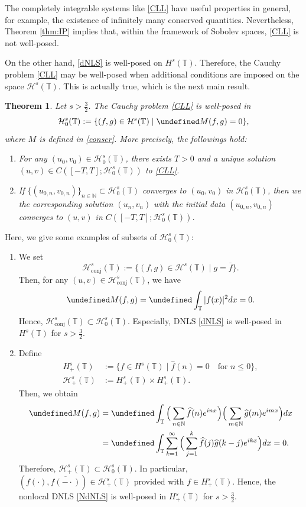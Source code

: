 \documentclass[%
11pt,  reqno]{amsart}
\newtheorem{theorem}{Theorem} [section]
\newcommand{\T}{\mathbb{T}}
\newcommand{\N}{\mathbb{N}}
\renewcommand{\H}{\mathcal H}
\newcommand{\ft}{\widehat}
\newcommand{\cj}{\overline}
\numberwithin{equation}{section}
\numberwithin{theorem}{section}
\let\Im=\undefined\DeclareMathOperator*{\Im}{Im}
\begin{document}
The completely integrable systems like \eqref{CLL} have useful properties in general,
for example, the existence of infinitely many conserved quantities. 
Nevertheless, 
Theorem \ref{thm:IP} implies that, 
within the framework of Sobolev spaces, 
\eqref{CLL} is not well-posed.

On the other hand, 
\eqref{dNLS} is well-posed on $H^s(\T)$. 
Therefore, 
the Cauchy problem \eqref{CLL} may be well-posed 
when additional conditions are imposed on the space $\H^s(\T)$.
This is actually true, which is the next main result.

\begin{theorem}
\label{thm:WP}
Let $s > \frac 32$.
The Cauchy problem \eqref{CLL} is well-posed in 
\begin{equation}
\H_0^s (\T) := \{ (f,g) \in \H^s(\T) \mid \Im M(f,g) = 0 \},
\label{subset} 
\end{equation}
where $M$ is defined in \eqref{conser}.
More precisely, the followings hold:
\begin{enumerate}
\item For any $(u_0, v_0) \in \H_0^s(\T)$, 
there exists $T>0$ and a unique solution $(u,v) \in C([-T,T]; \H_0^s(\T))$ to \eqref{CLL}.
\item If $\{ (u_{0,n}, v_{0,n}) \}_{n \in \N} \subset \H_0^s(\T)$ converges to
$(u_0, v_0)$ in $\H_0^s(\T)$,
then we the corresponding solution $(u_n, v_n)$ 
with the initial data $(u_{0,n}, v_{0,n})$ converges to $(u,v)$ in $C([-T,T]; \H_0^s(\T))$. 
\end{enumerate}
\end{theorem}

Here, we give some examples of subsets of $\H_0^s(\T)$:
\begin{enumerate}
\item 
We set
\[
\H_{\text{conj}}^s(\T) := \{(f,g) \in \H^s(\T) \mid g = \cj f\}.
\]
Then, for any $(u,v) \in \H_{\text{conj}}^s(\T)$, we have
\[
\Im M(f,g) = \Im \int_\T |f(x)|^2 dx = 0.
\]
Hence, $\H_{\text{conj}}^s(\T) \subset \H_0^s(\T)$. 
Especially, DNLS \eqref{dNLS} is well-posed in $H^s(\T)$ for $s > \frac 32$. 
\item
Define
\[
\begin{aligned}
H_+^s(\T) &:= \{ f \in H^s(\T) \mid \ft f (n) = 0 \quad \text {for $n \le 0$} \},
\\
\H^s_+(\T) &:= H_+^s(\T) \times H_+^s(\T).
\end{aligned}
\]
Then, we obtain
\[
\begin{aligned}
\Im M(f,g) 
&= \Im \int_\T \Big (\sum_{n \in \N} \ft f(n) e^{inx} \Big) 
\Big( \sum_{m \in \N} \ft g(m) e^{imx} \Big) dx
\\
&=
\Im \int_\T \sum_{k=1}^\infty \Big( \sum_{j=1}^k \ft f(j) \ft g(k-j) e^{ikx} \Big) dx = 0. 
\end{aligned}
\]
Therefore, $\H^s_+(\T) \subset \H_0^s(\T)$.
In particular, $(f(\cdot), \cj {f(-\cdot)} ) \in \H^s_+(\T)$ provided with $f \in H_+^s(\T)$.
Hence, the nonlocal DNLS \eqref{NdNLS} is well-posed in $H_+^s(\T)$ for $s > \frac 32$.
\end{enumerate}
\end{document}

